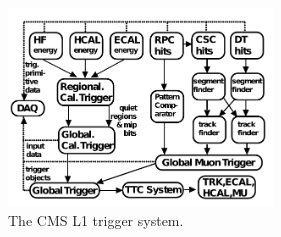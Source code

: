 \begin{figure}[hb!]
\centering
\includegraphics[width=0.625\textwidth]{figs/CMS-TRG-12-001_Figure_002.pdf}
\caption{The CMS L1 trigger system.}
\label{fig:trigger}
\end{figure}
